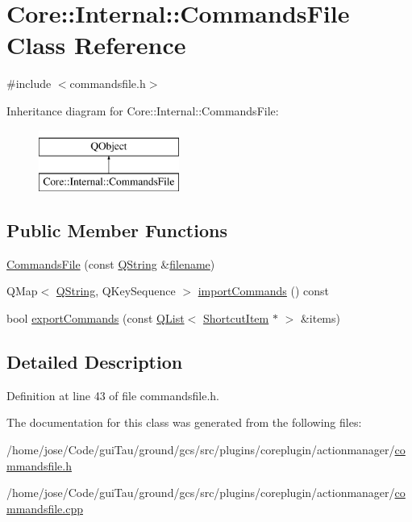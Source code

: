 \hypertarget{class_core_1_1_internal_1_1_commands_file}{\section{Core\-:\-:Internal\-:\-:Commands\-File Class Reference}
\label{class_core_1_1_internal_1_1_commands_file}
}


{\ttfamily \#include $<$commandsfile.\-h$>$}

Inheritance diagram for Core\-:\-:Internal\-:\-:Commands\-File\-:\begin{figure}[H]
\begin{center}
\leavevmode
\includegraphics[height=2.000000cm]{class_core_1_1_internal_1_1_commands_file}
\end{center}
\end{figure}
\subsection*{Public Member Functions}
\begin{DoxyCompactItemize}
\item 
\hyperlink{group___core_plugin_gaf5614402a98456713ff6873300bdaf43}{Commands\-File} (const \hyperlink{group___u_a_v_objects_plugin_gab9d252f49c333c94a72f97ce3105a32d}{Q\-String} \&\hyperlink{ioapi_8h_a7a03a664b090ce5c848ecb31cb4a2fa8}{filename})
\item 
Q\-Map$<$ \hyperlink{group___u_a_v_objects_plugin_gab9d252f49c333c94a72f97ce3105a32d}{Q\-String}, Q\-Key\-Sequence $>$ \hyperlink{group___core_plugin_ga3ffad3704d00bf33b20fdc4ab113cb92}{import\-Commands} () const 
\item 
bool \hyperlink{group___core_plugin_ga72b125d5736f93bdc1a42939e063d350}{export\-Commands} (const \hyperlink{class_q_list}{Q\-List}$<$ \hyperlink{struct_core_1_1_internal_1_1_shortcut_item}{Shortcut\-Item} $\ast$ $>$ \&items)
\end{DoxyCompactItemize}


\subsection{Detailed Description}


Definition at line 43 of file commandsfile.\-h.



The documentation for this class was generated from the following files\-:\begin{DoxyCompactItemize}
\item 
/home/jose/\-Code/gui\-Tau/ground/gcs/src/plugins/coreplugin/actionmanager/\hyperlink{commandsfile_8h}{commandsfile.\-h}\item 
/home/jose/\-Code/gui\-Tau/ground/gcs/src/plugins/coreplugin/actionmanager/\hyperlink{commandsfile_8cpp}{commandsfile.\-cpp}\end{DoxyCompactItemize}
